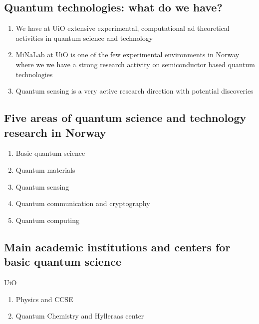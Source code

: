\documentclass[%
oneside,                 %
final,                   %
10pt]{article}
\begin{document}
\subsection{Quantum technologies: what do we have?}

\begin{enumerate}
\item We have at UiO extensive experimental, computational ad theoretical activities in quantum science and technology

\item MiNaLab at UiO is one of the few experimental environments in Norway where we we have a strong research activity on semiconductor based quantum technologies 

\item Quantum sensing is a very active research direction with potential discoveries
\end{enumerate}

\noindent
\subsection{Five areas of quantum science and technology research in Norway}

\begin{block}{}
\begin{enumerate}
\item Basic quantum science

\item Quantum materials

\item Quantum sensing

\item Quantum communication and cryptography

\item Quantum computing
\end{enumerate}

\noindent
\end{block}

\subsection{Main academic institutions and centers for basic quantum science}

\begin{block}{UiO }
\begin{enumerate}
\item Physics and CCSE

\item Quantum Chemistry and Hylleraas center
\end{enumerate}

\noindent
\end{block}
\end{document}
